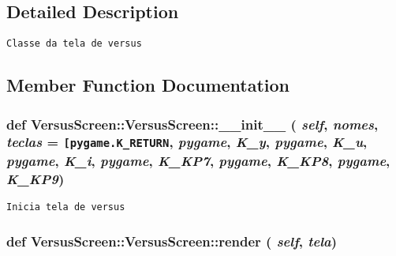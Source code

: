 \subsection{Detailed Description}


\begin{footnotesize}\begin{verbatim}Classe da tela de versus\end{verbatim}
\end{footnotesize}
 

\subsection{Member Function Documentation}
\hypertarget{class_versus_screen_1_1_versus_screen_225cac261f3a0a756cfea28cb4153c6d}{
\subsubsection[{\_\-\_\-init\_\-\_\-}]{\setlength{\rightskip}{0pt plus 5cm}def VersusScreen::VersusScreen::\_\-\_\-init\_\-\_\- ( {\em self}, \/   {\em nomes}, \/   {\em teclas} = {\tt \mbox{[}pygame.K\_\-RETURN}, \/   {\em pygame}, \/   {\em K\_\-y}, \/   {\em pygame}, \/   {\em K\_\-u}, \/   {\em pygame}, \/   {\em K\_\-i}, \/   {\em pygame}, \/   {\em K\_\-KP7}, \/   {\em pygame}, \/   {\em K\_\-KP8}, \/   {\em pygame}, \/   {\em K\_\-KP9})}}
\label{class_versus_screen_1_1_versus_screen_225cac261f3a0a756cfea28cb4153c6d}




\begin{footnotesize}\begin{verbatim}Inicia tela de versus\end{verbatim}
\end{footnotesize}
 \hypertarget{class_versus_screen_1_1_versus_screen_48a656b39ea261b62a4d0834498d24eb}{
\subsubsection[{render}]{\setlength{\rightskip}{0pt plus 5cm}def VersusScreen::VersusScreen::render ( {\em self}, \/   {\em tela})}}
\label{class_versus_screen_1_1_versus_screen_48a656b39ea261b62a4d0834498d24eb}




